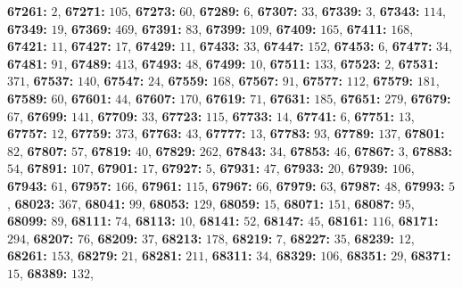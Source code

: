\textsf{\bfseries 67261:} $2$, \textsf{\bfseries 67271:} $105$, \textsf{\bfseries 67273:} $60$, \textsf{\bfseries 67289:} $6$, \textsf{\bfseries 67307:} $33$, \textsf{\bfseries 67339:} $3$, \textsf{\bfseries 67343:} $114$, \textsf{\bfseries 67349:} $19$, \textsf{\bfseries 67369:} $469$, \textsf{\bfseries 67391:} $83$, \textsf{\bfseries 67399:} $109$, \textsf{\bfseries 67409:} $165$, \textsf{\bfseries 67411:} $168$, \textsf{\bfseries 67421:} $11$, \textsf{\bfseries 67427:} $17$, \textsf{\bfseries 67429:} $11$, \textsf{\bfseries 67433:} $33$, \textsf{\bfseries 67447:} $152$, \textsf{\bfseries 67453:} $6$, \textsf{\bfseries 67477:} $34$, \textsf{\bfseries 67481:} $91$, \textsf{\bfseries 67489:} $413$, \textsf{\bfseries 67493:} $48$, \textsf{\bfseries 67499:} $10$, \textsf{\bfseries 67511:} $133$, \textsf{\bfseries 67523:} $2$, \textsf{\bfseries 67531:} $371$, \textsf{\bfseries 67537:} $140$, \textsf{\bfseries 67547:} $24$, \textsf{\bfseries 67559:} $168$, \textsf{\bfseries 67567:} $91$, \textsf{\bfseries 67577:} $112$, \textsf{\bfseries 67579:} $181$, \textsf{\bfseries 67589:} $60$, \textsf{\bfseries 67601:} $44$, \textsf{\bfseries 67607:} $170$, \textsf{\bfseries 67619:} $71$, \textsf{\bfseries 67631:} $185$, \textsf{\bfseries 67651:} $279$, \textsf{\bfseries 67679:} $67$, \textsf{\bfseries 67699:} $141$, \textsf{\bfseries 67709:} $33$, \textsf{\bfseries 67723:} $115$, \textsf{\bfseries 67733:} $14$, \textsf{\bfseries 67741:} $6$, \textsf{\bfseries 67751:} $13$, \textsf{\bfseries 67757:} $12$, \textsf{\bfseries 67759:} $373$, \textsf{\bfseries 67763:} $43$, \textsf{\bfseries 67777:} $13$, \textsf{\bfseries 67783:} $93$, \textsf{\bfseries 67789:} $137$, \textsf{\bfseries 67801:} $82$, \textsf{\bfseries 67807:} $57$, \textsf{\bfseries 67819:} $40$, \textsf{\bfseries 67829:} $262$, \textsf{\bfseries 67843:} $34$, \textsf{\bfseries 67853:} $46$, \textsf{\bfseries 67867:} $3$, \textsf{\bfseries 67883:} $54$, \textsf{\bfseries 67891:} $107$, \textsf{\bfseries 67901:} $17$, \textsf{\bfseries 67927:} $5$, \textsf{\bfseries 67931:} $47$, \textsf{\bfseries 67933:} $20$, \textsf{\bfseries 67939:} $106$, \textsf{\bfseries 67943:} $61$, \textsf{\bfseries 67957:} $166$, \textsf{\bfseries 67961:} $115$, \textsf{\bfseries 67967:} $66$, \textsf{\bfseries 67979:} $63$, \textsf{\bfseries 67987:} $48$, \textsf{\bfseries 67993:} $5$, \textsf{\bfseries 68023:} $367$, \textsf{\bfseries 68041:} $99$, \textsf{\bfseries 68053:} $129$, \textsf{\bfseries 68059:} $15$, \textsf{\bfseries 68071:} $151$, \textsf{\bfseries 68087:} $95$, \textsf{\bfseries 68099:} $89$, \textsf{\bfseries 68111:} $74$, \textsf{\bfseries 68113:} $10$, \textsf{\bfseries 68141:} $52$, \textsf{\bfseries 68147:} $45$, \textsf{\bfseries 68161:} $116$, \textsf{\bfseries 68171:} $294$, \textsf{\bfseries 68207:} $76$, \textsf{\bfseries 68209:} $37$, \textsf{\bfseries 68213:} $178$, \textsf{\bfseries 68219:} $7$, \textsf{\bfseries 68227:} $35$, \textsf{\bfseries 68239:} $12$, \textsf{\bfseries 68261:} $153$, \textsf{\bfseries 68279:} $21$, \textsf{\bfseries 68281:} $211$, \textsf{\bfseries 68311:} $34$, \textsf{\bfseries 68329:} $106$, \textsf{\bfseries 68351:} $29$, \textsf{\bfseries 68371:} $15$, \textsf{\bfseries 68389:} $132$, 
